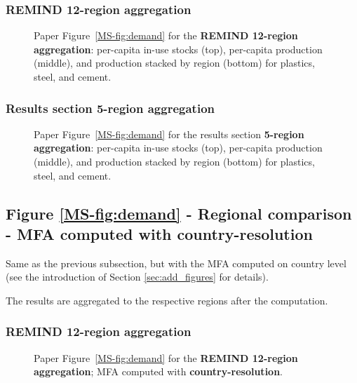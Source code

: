\subsubsection{REMIND 12-region aggregation}
\begin{figure}[htbp]
    \centering
    \caption{Paper Figure~\ref{MS-fig:demand} for the \textbf{REMIND 12-region aggregation}: per-capita in-use stocks (top), per-capita production (middle), and production stacked by region (bottom) for plastics, steel, and cement.}
    \label{fig:figure_5_h12}
\end{figure}

\clearpage
\subsubsection{Results section 5-region aggregation}
\begin{figure}[htbp]
    \centering
    \caption{Paper Figure~\ref{MS-fig:demand} for the results section \textbf{5-region aggregation}: per-capita in-use stocks (top), per-capita production (middle), and production stacked by region (bottom) for plastics, steel, and cement.}
    \label{fig:figure_5_agg5}
\end{figure}


\clearpage
\subsection{Figure \texorpdfstring{\ref{MS-fig:demand}}{5} - Regional comparison - MFA computed with country-resolution} \label{sec:add_fig_5_countries}

Same as the previous subsection, but with the MFA computed on country level (see the introduction of Section \ref{sec:add_figures} for details).

The results are aggregated to the respective regions after the computation.

\subsubsection{REMIND 12-region aggregation}
\begin{figure}[htbp]
    \centering
    \caption{Paper Figure~\ref{MS-fig:demand} for the \textbf{REMIND 12-region aggregation}; MFA computed with \textbf{country-resolution}.}
    \label{fig:figure_5_h12_countries}
\end{figure}

